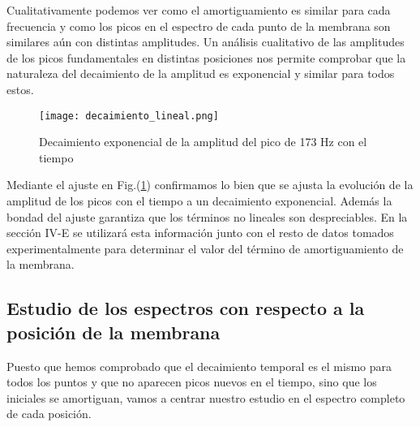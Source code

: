 \documentclass[journal, a4paper,onecolumn]{IEEEtran}
\newcommand{\figref}[1]{Fig.(\ref{#1})}
\begin{document}
Cualitativamente podemos ver como el amortiguamiento es similar para cada frecuencia y como los picos en el espectro de cada punto de la membrana son similares aún con distintas amplitudes. Un análisis cualitativo de las amplitudes de los picos fundamentales en distintas posiciones nos permite comprobar que la naturaleza del decaimiento de la amplitud es exponencial y similar para todos estos. \newline

\begin{figure}[H]
    \centering
    \texttt{[image: decaimiento\_lineal.png]}    
    \caption{Decaimiento exponencial de la amplitud del pico de 173 Hz con el tiempo}
\label{decaimiento_amplitud}
\end{figure}

Mediante el ajuste en \figref{decaimiento_amplitud} confirmamos lo bien que se ajusta la evolución de la amplitud de los picos con el tiempo a un decaimiento exponencial. Además la bondad del ajuste garantiza que los términos no lineales son despreciables. En la sección IV-E se utilizará esta información junto con el resto de datos tomados experimentalmente para determinar el valor del término de amortiguamiento de la membrana.

\subsection{Estudio de los espectros con respecto a la posición de la membrana}

Puesto que hemos comprobado que el decaimiento temporal es el mismo para todos los puntos y que no aparecen picos nuevos en el tiempo, sino que los iniciales se amortiguan, vamos a centrar nuestro estudio en el espectro completo de cada posición. \newline

\begin{figure}[H]%
    \centering
    \quad
    \quad
     
    \quad
\end{figure}

 \begin{figure}[H]%
 \centering
    \quad
    \quad
    \end{figure} 
    
\end{document}
